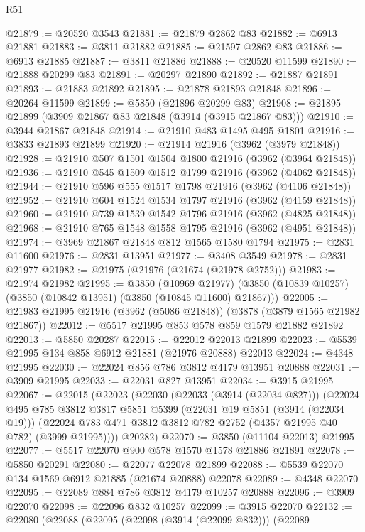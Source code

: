 \begin{lexlean}{R51}
\begin{coremodule}
@21879 := @20520 @3543
@21881 := @21879 @2862 @83
@21882 := @6913 @21881
@21883 := @3811 @21882
@21885 := @21597 @2862 @83
@21886 := @6913 @21885
@21887 := @3811 @21886
@21888 := @20520 @11599
@21890 := @21888 @20299 @83
@21891 := @20297 @21890
@21892 := @21887 @21891
@21893 := @21883 @21892
@21895 := @21878 @21893 @21848
@21896 := @20264 @11599
@21899 := @5850 (@21896 @20299 @83)
@21908 := @21895 @21899 (@3909 @21867 @83 @21848 (@3914 (@3915 @21867 @83)))
@21910 := @3944 @21867 @21848
@21914 := @21910 @483 @1495 @495 @1801
@21916 := @3833 @21893 @21899
@21920 := @21914 @21916 (@3962 (@3979 @21848))
@21928 := @21910 @507 @1501 @1504 @1800 @21916 (@3962 (@3964 @21848))
@21936 := @21910 @545 @1509 @1512 @1799 @21916 (@3962 (@4062 @21848))
@21944 := @21910 @596 @555 @1517 @1798 @21916 (@3962 (@4106 @21848))
@21952 := @21910 @604 @1524 @1534 @1797 @21916 (@3962 (@4159 @21848))
@21960 := @21910 @739 @1539 @1542 @1796 @21916 (@3962 (@4825 @21848))
@21968 := @21910 @765 @1548 @1558 @1795 @21916 (@3962 (@4951 @21848))
@21974 := @3969 @21867 @21848 @812 @1565 @1580 @1794
@21975 := @2831 @11600
@21976 := @2831 @13951
@21977 := @3408 @3549
@21978 := @2831 @21977
@21982 := @21975 (@21976 (@21674 (@21978 @2752)))
@21983 := @21974 @21982
@21995 := @3850
    (@10969 @21977)
    (@3850 (@10839 @10257) (@3850 (@10842 @13951) (@3850 (@10845 @11600) @21867)))
@22005 := @21983 @21995 @21916 (@3962 (@5086 @21848)) (@3878 (@3879 @1565 @21982 @21867))
@22012 := @5517 @21995 @853 @578 @859 @1579 @21882 @21892
@22013 := @5850 @20287
@22015 := @22012 @22013 @21899
@22023 := @5539 @21995 @134 @858 @6912 @21881 (@21976 @20888) @22013
@22024 := @4348 @21995
@22030 := @22024 @856 @786 @3812 @4179 @13951 @20888
@22031 := @3909 @21995
@22033 := @22031 @827 @13951
@22034 := @3915 @21995
@22067 := @22015
    (@22023
      (@22030
        (@22033 (@3914 (@22034 @827)))
        (@22024
          @495
          @785
          @3812
          @3817
          @5851
          @5399
          (@22031 @19 @5851 (@3914 (@22034 @19)))
          (@22024 @783 @471 @3812 @3812 @782 @2752 (@4357 @21995 @40 @782) (@3999 @21995))))
      @20282)
@22070 := @3850 (@11104 @22013) @21995
@22077 := @5517 @22070 @900 @578 @1570 @1578 @21886 @21891
@22078 := @5850 @20291
@22080 := @22077 @22078 @21899
@22088 := @5539 @22070 @134 @1569 @6912 @21885 (@21674 @20888) @22078
@22089 := @4348 @22070
@22095 := @22089 @884 @786 @3812 @4179 @10257 @20888
@22096 := @3909 @22070
@22098 := @22096 @832 @10257
@22099 := @3915 @22070
@22132 := @22080
    (@22088
      (@22095
        (@22098 (@3914 (@22099 @832)))
        (@22089

\end{coremodule}
\end{lexlean}
